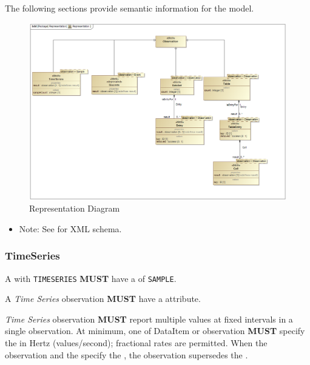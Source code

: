 The following sections provide semantic information for the  model.

\begin{figure}[ht]
  \centering
    \includegraphics[width=1.0\textwidth]{figures/Representation.png}
  \caption{Representation Diagram}
  \label{fig:Representation Diagram}
\end{figure}

\FloatBarrier



\begin{itemize}
    \item Note: See  for XML schema.
\end{itemize}




\subsubsection{TimeSeries}
\label{sec:TimeSeries}




A  with \texttt{TIME\textunderscore SERIES}  \textbf{MUST} have a  of \texttt{SAMPLE}.

A \textit{Time Series} \gls{observation} \textbf{MUST} have a  attribute.

\textit{Time Series} \gls{observation} \textbf{MUST} report multiple values at fixed intervals in a single \gls{observation}. At minimum, one of DataItem or \gls{observation} \textbf{MUST} specify the  in Hertz (values/second); fractional rates are permitted. When the \gls{observation} and the  specify the , the \gls{observation}  supersedes the .

